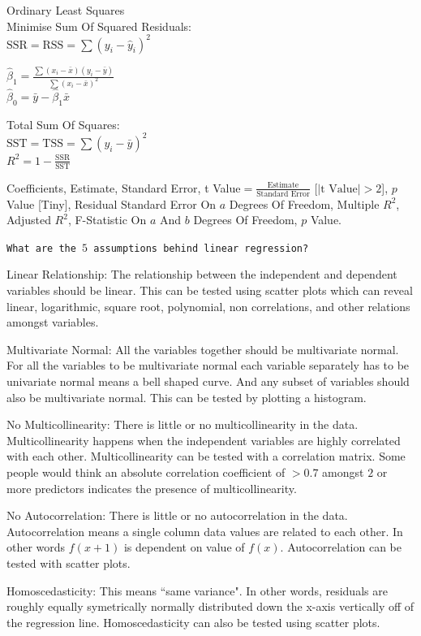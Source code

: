 Ordinary Least Squares \\
Minimise Sum Of Squared Residuals: \\
$\text{SSR} = \text{RSS} = \sum (y_i-\hat{y}_i)^2$

$\hat{\beta}_1=\frac{\sum (x_i-\bar{x})(y_i-\bar{y})}{\sum (x_i-\bar{x})^2}$ \\
$\hat{\beta}_0=\bar{y}-\hat{\beta}_1 \bar{x}$

Total Sum Of Squares: \\
$\text{SST} = \text{TSS} = \sum (y_i-\bar{y})^2$ \\

$R^2=1-\frac{\text{SSR}}{\text{SST}}$

Coefficients, Estimate, Standard Error, t Value$=\frac{\text{Estimate}}{\text{Standard Error}}$ [$|\text{t Value}|>2$], $p$ Value [Tiny], Residual Standard Error On $a$ Degrees Of Freedom, Multiple $R^2$, Adjusted $R^2$, F-Statistic On $a$ And $b$ Degrees Of Freedom, $p$ Value.

\texttt{What are the $5$ assumptions behind linear regression?}

Linear Relationship: The relationship between the independent and dependent variables should be linear. This can be tested using scatter plots which can reveal linear, logarithmic, square root, polynomial, non correlations, and other relations amongst variables.

Multivariate Normal: All the variables together should be multivariate normal. For all the variables to be multivariate normal each variable separately has to be univariate normal means a bell shaped curve. And any subset of variables should also be multivariate normal. This can be tested by plotting a histogram.

No Multicollinearity: There is little or no multicollinearity in the data. Multicollinearity happens when the independent variables are highly correlated with each other. Multicollinearity can be tested with a correlation matrix. Some people would think an absolute correlation coefficient of $>0.7$ amongst $2$ or more predictors indicates the presence of multicollinearity.

No Autocorrelation: There is little or no autocorrelation in the data. Autocorrelation means a single column data values are related to each other. In other words $f(x+1)$ is dependent on value of $f(x)$. Autocorrelation can be tested with scatter plots.

Homoscedasticity: This means ``same variance". In other words, residuals are roughly equally symetrically normally distributed down the x-axis vertically off of the regression line. Homoscedasticity can also be tested using scatter plots.

